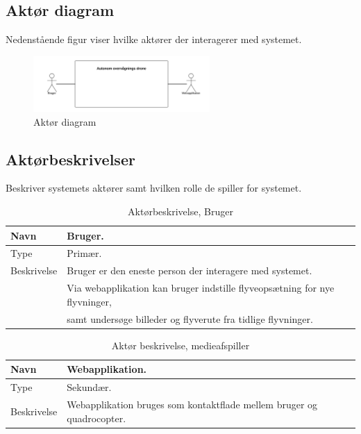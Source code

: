 \subsection{Aktør diagram}
Nedenstående figur viser hvilke aktører der interagerer med systemet.

\begin{figure}[H]
\centering
\includegraphics[width=0.6\textwidth]{Billeder/Aktor_diagram.png}
\caption{Aktør diagram}
\label{fig:ATD}
\end{figure}

\subsection{Aktørbeskrivelser}
Beskriver systemets aktører samt hvilken rolle de spiller for systemet.

\begin{table}[H]
\begin{tabular}{|l|p{13.25cm}|} \hline

Navn					& Bruger. 	\\\hline
Type					& Primær.	\\\hline
Beskrivelse				& Bruger er den eneste person der interagere med systemet.\\
						& Via webapplikation kan bruger indstille flyveopsætning for nye flyvninger, \\ 
						& samt undersøge billeder og flyverute fra tidlige flyvninger.\\\hline
						
\end{tabular}
\caption{Aktørbeskrivelse, Bruger}
\label{tab:AB1}
\end{table}


\begin{table}[H]
\begin{tabular}{|l|p{13.25cm}|}
\hline
Navn					& Webapplikation. 	\\\hline
Type					& Sekundær.	\\\hline
Beskrivelse				& Webapplikation bruges som kontaktflade mellem bruger og quadrocopter.\\\hline

\end{tabular}
\caption{Aktør beskrivelse, medieafspiller}
\label{tab:AB2}
\end{table}